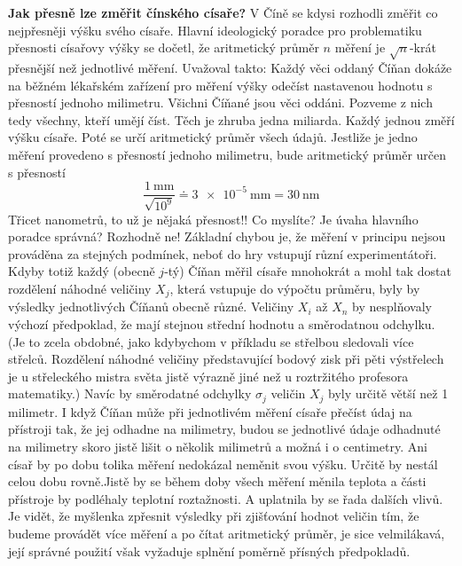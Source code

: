 \begin{mdframed}[style=mdexam]
  \begin{example}\label{mai:exam074}
    \textbf{Jak přesně lze změřit čínského císaře?}\newline
      V Číně se kdysi rozhodli změřit co nejpřesněji výšku svého císaře. Hlavní ideologický poradce
      pro problematiku přesnosti císařovy výšky se dočetl, že aritmetický průměr \(n\) měření je
      \(\sqrt{n}\)-krát přesnější než jednotlivé měření. Uvažoval takto: Každý věci oddaný Číňan
      dokáže na běžném lékařském zařízení pro měření výšky odečíst nastavenou hodnotu s přesností
      jednoho milimetru. Všichni Číňané jsou věci oddáni. Pozveme z nich tedy všechny, kteří umějí
      číst. Těch je zhruba jedna miliarda. Každý jednou změří výšku císaře. Poté se určí aritmetický
      průměr všech údajů. Jestliže je jedno měření provedeno s přesností jednoho milimetru, bude
      aritmetický průměr určen s přesností 
      \begin{equation*}
        \dfrac{\SI{1}{\mm}}{\sqrt{10^9}}\doteq\SI{3e-5}{\mm} = \SI{30}{\nm}
      \end{equation*}
      Třicet nanometrů, to už je nějaká přesnost!! Co myslíte? Je úvaha hlavního poradce správná?
      Rozhodně ne! Základní chybou je, že měření v principu nejsou prováděna za stejných podmínek,
      neboť do hry vstupují různí experimentátoři. Kdyby totiž každý (obecně \(j\)-tý) Číňan měřil
      císaře mnohokrát a mohl tak dostat rozdělení náhodné veličiny \(X_j\), která vstupuje do
      výpočtu průměru, byly by výsledky jednotlivých Číňanů obecně různé. Veličiny \(X_i\) až
      \(X_n\) by nesplňovaly výchozí předpoklad, že mají stejnou střední hodnotu a směrodatnou
      odchylku. (Je to zcela obdobné, jako kdybychom v příkladu se střelbou sledovali více střelců.
      Rozdělení náhodné veličiny představující bodový zisk při pěti výstřelech je u střeleckého
      mistra světa jistě výrazně jiné než u roztržitého profesora matematiky.) Navíc by směrodatné
      odchylky \(\sigma_j\) veličin \(X_j\) byly určitě větší než 1 milimetr. I když Číňan může při
      jednotlivém měření císaře přečíst údaj na přístroji tak, že jej odhadne na milimetry, budou se
      jednotlivé údaje odhadnuté na milimetry skoro jistě lišit o několik milimetrů a možná i o
      centimetry. Ani císař by po dobu tolika měření nedokázal neměnit svou výšku. Určitě by nestál
      celou dobu rovně.Jistě by se během doby všech měření měnila teplota a části přístroje by
      podléhaly teplotní roztažnosti. A uplatnila by se řada dalších vlivů. Je vidět, že myšlenka
      zpřesnit výsledky při zjišťování hodnot veličin tím, že budeme provádět více měření a po čítat
      aritmetický průměr, je sice velmilákavá, její správné použití však vyžaduje splnění poměrně
      přísných předpokladů.
      

\end{example}
\end{mdframed}
